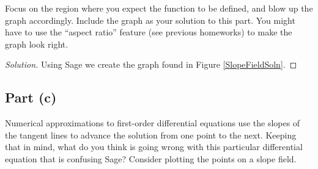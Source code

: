 \documentclass[letterpaper, 12pt]{amsart}
\theoremstyle{definition}  							%
\begin{document}
		Focus on the region where you expect the function to be defined, and blow up the graph accordingly. 
		Include the graph as your solution to this part. 
		You might have to use the ``aspect ratio'' feature (see previous homeworks) to make the graph look right.

		\begin{proof}[Solution]
			Using Sage we create the graph found in Figure \ref{SlopeFieldSoln}.
		\end{proof}

		\subsection*{Part (c)}
		Numerical approximations to first-order differential equations use the slopes of the tangent lines to advance the solution from one point to the next. 
		Keeping that in mind, what do you think is going wrong with this particular differential equation that is confusing Sage? 
		Consider plotting the points on a slope field.
\end{document}
